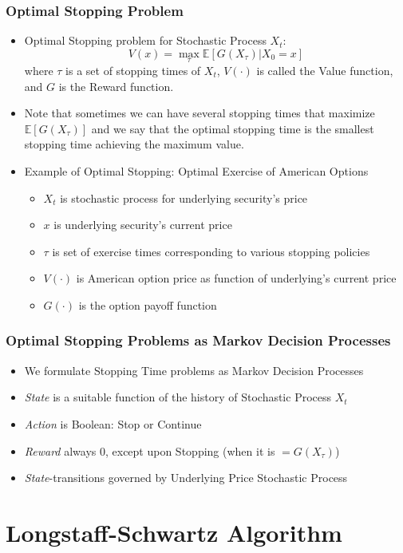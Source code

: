 \documentclass[handout]{beamer}
\begin{document}
\begin{frame}
\frametitle{Optimal Stopping Problem}
\pause
\begin{itemize}[<+->]
\item Optimal Stopping problem for Stochastic Process $X_t$: 
$$V(x) = \max_{\tau} \mathbb{E}[G(X_{\tau})|X_0 = x]$$
 where $\tau$ is a set of stopping times of $X_t$, $V(\cdot)$ is called the Value function, and $G$ is the Reward function.
\item Note that sometimes we can have several stopping times that maximize $\mathbb{E}[G(X_{\tau})]$ and we say that the optimal stopping time
is the smallest stopping time achieving the maximum value.
\item Example of Optimal Stopping: Optimal Exercise of American Options
\begin{itemize}
\item $X_t$ is stochastic process for underlying security's price
\item $x$ is underlying security's current price
\item $\tau$ is set of exercise times corresponding to various stopping policies
\item $V(\cdot)$ is American option price as function of underlying's current price
\item $G(\cdot)$ is the option payoff function
\end{itemize}
\end{itemize}
\end{frame}


\begin{frame}
\frametitle{Optimal Stopping Problems as Markov Decision Processes}
\pause
\begin{itemize}[<+->]
\item We formulate Stopping Time problems as Markov Decision Processes
\item {\em State} is a suitable function of the history of Stochastic Process $X_t$
\item {\em Action} is Boolean: Stop or Continue
\item {\em Reward} always 0, except upon Stopping (when it is $=G(X_{\tau})$)
\item {\em State}-transitions governed by Underlying Price Stochastic Process
\end{itemize}
\end{frame}

\section{Longstaff-Schwartz Algorithm}
\end{document}
